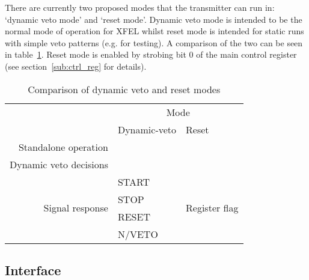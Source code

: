 \documentclass[]{article}
\newcommand{\cmark}{\ding{51}}%
\newcommand{\xmark}{\ding{55}}%
\begin{document}
    There are currently two proposed modes that the transmitter can run in: `dynamic veto mode' and `reset mode'. Dynamic veto mode is intended to be the normal mode of operation for XFEL whilst reset mode is intended for static runs with simple veto patterns (e.g. for testing). A comparison of the two can be seen in table~\ref{tab:dynamic_vs_reset_mode}. Reset mode is enabled by strobing bit 0 of the main control register (see section~\ref{sub:ctrl_reg} for details). 
    
    \begin{table}
        \begin{center}
        \begin{tabular}{r | X{2.5cm} | X{2.5cm} }
                                   & \multicolumn{2}{c}{Mode} \\
                                   & Dynamic-veto & Reset \\
            \hline
            Standalone operation   & \xmark & \cmark \\
            Dynamic veto decisions & \cmark & \xmark \\
            \multirow{4}{*}{Signal response}
                                   & START  & \multirow{4}{*}{Register flag} \\
                                   & STOP   & \\
                                   & RESET  & \\
                                   & N/VETO & \\
        \end{tabular}
        \end{center}
        \caption{Comparison of dynamic veto and reset modes}
        \label{tab:dynamic_vs_reset_mode}
    \end{table} 
    
    \subsection{Interface} %
    \label{sub:tx_interface}
    
\end{document}
